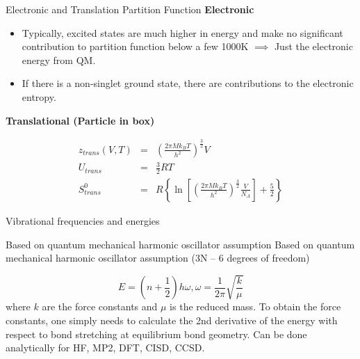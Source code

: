 \documentclass[aspectratio=169]{beamer}
\begin{document}
\begin{frame}{Electronic and Translation Partition Function}
\textbf{Electronic}
\begin{itemize}
    \item Typically, excited states are much higher in energy and make no significant contribution to partition function below a few 1000K $\implies$ Just the electronic energy from QM. 
    \item If there is a non-singlet ground state, there are contributions to the electronic entropy.
\end{itemize}

\textbf{Translational (Particle in box)}

\begin{eqnarray*}
    z_{trans}(V, T) & = & \left( \frac{2\pi Mk_BT}{h^2} \right)^{\frac{3}{2}} V\\
    U_{trans} & = & \frac{3}{2} RT\\
    S_{trans}^0 & = & R\left \{ \ln \left [{\left( \frac{2\pi Mk_BT}{h^2} \right) ^{\frac{3}{2}}}  \frac{V}{N_A} \right ] + \frac{5}{2} \right  \}
\end{eqnarray*}

\end{frame} 


\begin{frame}{Vibrational frequencies and energies}

Based on quantum mechanical harmonic oscillator assumption Based on quantum mechanical harmonic oscillator assumption (3N – 6 degrees of freedom)

\begin{equation*}
    E = (n+\frac{1}{2})h\omega,  \omega = \frac{1}{2\pi}\sqrt{\frac{k}{\mu}}
\end{equation*}
where $k$ are the force constants and $\mu$ is the reduced mass.\newline
\newline
To obtain the force constants, one simply needs to calculate the 2nd derivative of the energy with respect to bond stretching at equilibrium bond geometry.\newline
\newline
Can be done analytically for HF, MP2, DFT, CISD, CCSD.

\end{frame} 
\end{document}
